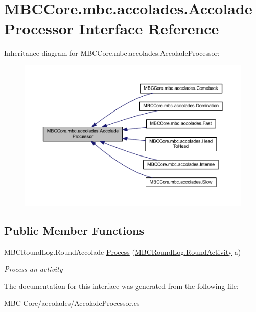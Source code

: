 \hypertarget{interface_m_b_c_core_1_1mbc_1_1accolades_1_1_accolade_processor}{\section{M\-B\-C\-Core.\-mbc.\-accolades.\-Accolade\-Processor Interface Reference}
\label{interface_m_b_c_core_1_1mbc_1_1accolades_1_1_accolade_processor}
}


Inheritance diagram for M\-B\-C\-Core.\-mbc.\-accolades.\-Accolade\-Processor\-:\nopagebreak
\begin{figure}[H]
\begin{center}
\leavevmode
\includegraphics[width=350pt]{interface_m_b_c_core_1_1mbc_1_1accolades_1_1_accolade_processor__inherit__graph}
\end{center}
\end{figure}
\subsection*{Public Member Functions}
\begin{DoxyCompactItemize}
\item 
\hypertarget{interface_m_b_c_core_1_1mbc_1_1accolades_1_1_accolade_processor_a9d8f9471b266b09763639f146b11e0a7}{M\-B\-C\-Round\-Log.\-Round\-Accolade \hyperlink{interface_m_b_c_core_1_1mbc_1_1accolades_1_1_accolade_processor_a9d8f9471b266b09763639f146b11e0a7}{Process} (\hyperlink{class_m_b_c_core_1_1_m_b_c_round_log_1_1_round_activity}{M\-B\-C\-Round\-Log.\-Round\-Activity} a)}\label{interface_m_b_c_core_1_1mbc_1_1accolades_1_1_accolade_processor_a9d8f9471b266b09763639f146b11e0a7}

\begin{DoxyCompactList}\small\item\em Process an activity\end{DoxyCompactList}\end{DoxyCompactItemize}


The documentation for this interface was generated from the following file\-:\begin{DoxyCompactItemize}
\item 
M\-B\-C Core/accolades/Accolade\-Processor.\-cs\end{DoxyCompactItemize}
